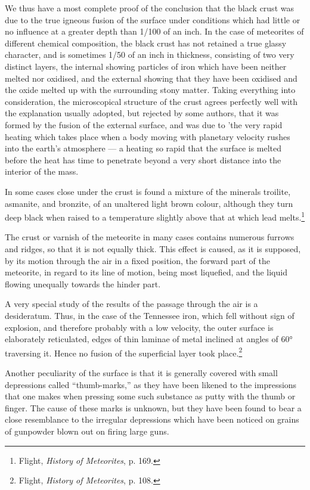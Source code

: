\documentclass[a4paper, 12pt, oneside, polutonikogreek, english]{article}
\begin{document}
We thus have a most complete proof of the conclusion that the black crust was due to the true igneous fusion of the surface under conditions which had little or no influence at a greater depth than 1/100 of an inch. In the case of meteorites of different chemical composition, the black crust has not retained a true glassy character, and is sometimes 1/50 of an inch in thickness, consisting of two very distinct layers, the internal showing particles of iron which have been neither melted nor oxidised, and the external showing that they have been oxidised and the oxide melted up with the surrounding stony matter. Taking everything into consideration, the microscopical structure of the crust agrees perfectly well with the explanation usually adopted, but rejected by some authors, that it was formed by the fusion of the external surface, and was due to 'the very rapid heating which takes place when a body moving with planetary velocity rushes into the earth's atmosphere --- a heating so rapid that the surface is melted before the heat has time to penetrate beyond a very short distance into the interior of the mass.

In some cases close under the crust is found a mixture of the minerals troilite, asmanite, and bronzite, of an unaltered light brown colour, although they turn deep black when raised to a temperature slightly above that at which lead melts.\footnote{Flight, \emph{History of Meteorites}, p. 169.}

The crust or varnish of the meteorite in many cases contains numerous furrows and ridges, so that it is not equally thick. This effect is caused, as it is supposed, by its motion through the air in a fixed position, the forward part of the meteorite, in regard to its line of motion, being most liquefied, and the liquid flowing unequally towards the hinder part.

A very special study of the results of the passage through the air is a desideratum. Thus, in the case of the Tennessee iron, which fell without sign of explosion, and therefore probably with a low velocity, the outer surface is elaborately reticulated, edges of thin laminae of metal inclined at angles of 60° traversing it. Hence no fusion of the superficial layer took place.\footnote{Flight, \emph{History of Meteorites}, p. 108.}

Another peculiarity of the surface is that it is generally covered with small depressions called ``thumb-marks,'' as they have been likened to the impressions that one makes when pressing some such substance as putty with the thumb or finger. The cause of these marks is unknown, but they have been found to bear a close resemblance to the irregular depressions which have been noticed on grains of gunpowder blown out on firing large guns.
\end{document}
